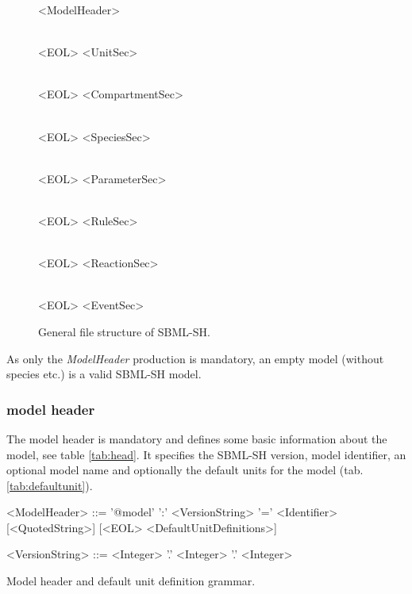 \documentclass[a4paper]{article}
\begin{document}
\begin{figure}[h!]
\centering
\begin{syntdiag*}
<ModelHeader>
\begin{stack} \\ <EOL> <UnitSec> \end{stack}	
\begin{stack} \\ <EOL> <CompartmentSec> \end{stack}	
\end{syntdiag*}

\begin{syntdiag*}
\begin{stack} \\ <EOL> <SpeciesSec> \end{stack}	
\begin{stack} \\ <EOL> <ParameterSec> \end{stack}	
\begin{stack} \\ <EOL> <RuleSec> \end{stack}	
\end{syntdiag*}

\begin{syntdiag*}
\begin{stack} \\ <EOL> <ReactionSec> \end{stack}	
\begin{stack} \\ <EOL> <EventSec> \end{stack}	
\end{syntdiag*}
\caption{General file structure of SBML-SH.} \label{fig:root}
\end{figure}

As only the \emph{ModelHeader} production is mandatory, an empty model (without species etc.) is a valid SBML-SH model.


\subsubsection*{model header}
The model header is mandatory and defines some basic information about the model, see table \ref{tab:head}. It specifies the SBML-SH version, model identifier, an optional model name and optionally the default units for the model (tab. \ref{tab:defaultunit}).

\begin{table}[h!]
\begin{grammar}
<ModelHeader> ::= '@model' ':' <VersionString> '=' <Identifier> [<QuotedString>] [<EOL> <DefaultUnitDefinitions>]

<VersionString> ::= <Integer> '.' <Integer> '.' <Integer>
\end{grammar}
\caption{Model header and default unit definition grammar.} \label{tab:head}
\end{table}
\end{document}
